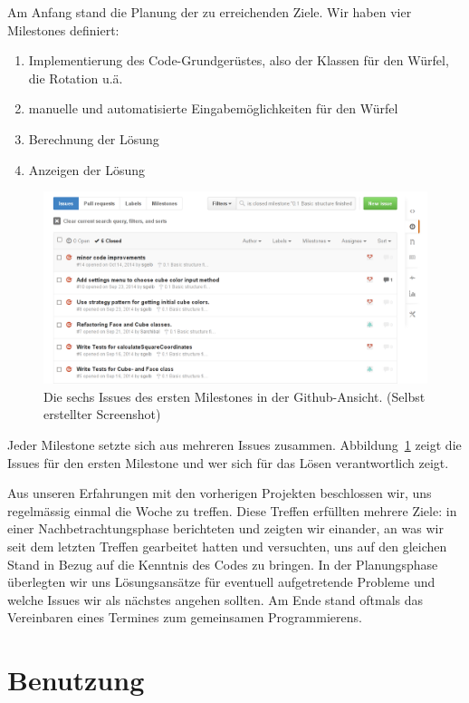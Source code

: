 Am Anfang stand die Planung der zu erreichenden Ziele. Wir haben vier Milestones definiert:

\begin{enumerate}
  \item Implementierung des Code-Grundgerüstes, also der Klassen für den Würfel,
    die Rotation u.ä.
  \item manuelle und automatisierte Eingabemöglichkeiten für den Würfel
  \item Berechnung der Lösung
  \item Anzeigen der Lösung
\end{enumerate}

\begin{figure}[ht!]
  \centering
  \includegraphics[width=\textwidth]{pics/github_issues.png}
  \caption{Die sechs Issues des ersten Milestones in der Github-Ansicht.
  (Selbst erstellter Screenshot)}
  \label{fig:github_issues}
\end{figure}

Jeder Milestone setzte sich aus mehreren Issues zusammen.
Abbildung~\ref{fig:github_issues} zeigt die Issues für den ersten Milestone und
wer sich für das Lösen verantwortlich zeigt.

Aus unseren Erfahrungen mit den vorherigen Projekten beschlossen wir, uns
regelmässig einmal die Woche zu treffen. Diese Treffen erfüllten mehrere Ziele:
in einer Nachbetrachtungsphase berichteten und zeigten wir einander, an was wir
seit dem letzten Treffen gearbeitet hatten und versuchten, uns auf den gleichen
Stand in Bezug auf die Kenntnis des Codes zu bringen. In der Planungsphase
überlegten wir uns Lösungsansätze für eventuell aufgetretende Probleme und
welche Issues wir als nächstes angehen sollten. Am Ende stand oftmals das
Vereinbaren eines Termines zum gemeinsamen Programmierens.


\section{Benutzung}  %

